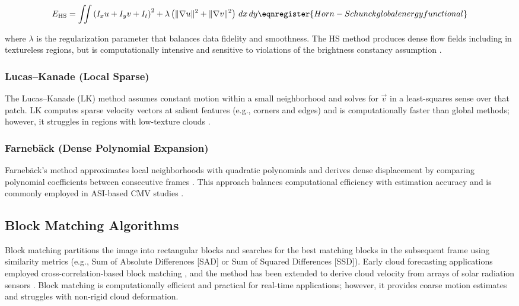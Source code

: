 \begin{equation}
E_{\text{HS}} = \iint \left( I_x u + I_y v + I_t \right)^2 + \lambda \left(\|\nabla u\|^2 + \|\nabla v\|^2\right) \, dx \, dy
\eqnregister{Horn-Schunck global energy functional}
\end{equation}

where $\lambda$ is the regularization parameter that balances data fidelity and smoothness. The HS method produces dense flow fields including in textureless regions, but is computationally intensive and sensitive to violations of the brightness constancy assumption \cite{horn1981determining}.

\subsubsection{Lucas--Kanade (Local Sparse)}
The Lucas--Kanade (LK) method assumes constant motion within a small neighborhood and solves for $\vec{v}$ in a least-squares sense over that patch. LK computes sparse velocity vectors at salient features (e.g., corners and edges) and is computationally faster than global methods; however, it struggles in regions with low-texture clouds \cite{lucas1981iterative}.

\subsubsection{Farneb\"ack (Dense Polynomial Expansion)}
Farneb\"ack's method approximates local neighborhoods with quadratic polynomials and derives dense displacement by comparing polynomial coefficients between consecutive frames \cite{farneback2003two}. This approach balances computational efficiency with estimation accuracy and is commonly employed in ASI-based CMV studies \cite{urquhart2016}.

\subsection{Block Matching Algorithms}
Block matching partitions the image into rectangular blocks and searches for the best matching blocks in the subsequent frame using similarity metrics (e.g., Sum of Absolute Differences [SAD] or Sum of Squared Differences [SSD]). Early cloud forecasting applications employed cross-correlation-based block matching \cite{hamill1993}, and the method has been extended to derive cloud velocity from arrays of solar radiation sensors \cite{bosch2013}. Block matching is computationally efficient and practical for real-time applications; however, it provides coarse motion estimates and struggles with non-rigid cloud deformation.

